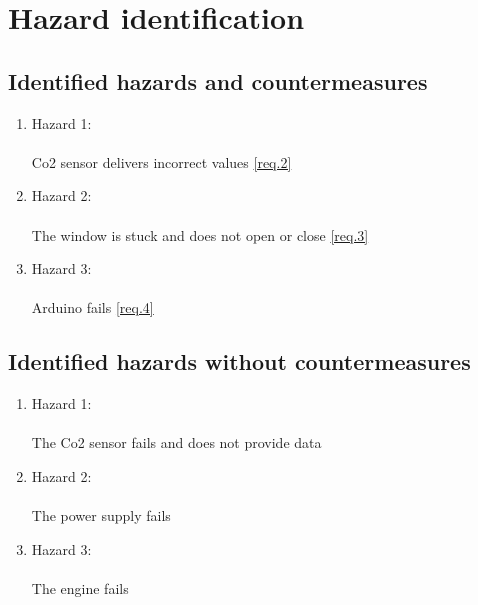 \section{Hazard identification}
\label{chapter4}

\subsection{Identified hazards and countermeasures}


	\begin{enumerate}
		\item \label{hazc.1} Hazard 1: \\
            \\	Co2 sensor delivers incorrect values \ref{req.2} \\
		\item \label{hazc.2} Hazard 2: \\
            \\	The window is stuck and does not open or close \ref{req.3} \\
		\item \label{hazc.3} Hazard 3: \\
            \\	Arduino fails \ref{req.4} \\
	\end{enumerate}
	
\subsection{Identified hazards without countermeasures }

	\begin{enumerate}
		\item \label{haz.1} Hazard 1: \\
            \\	The Co2 sensor fails and does not provide data \\
		\item \label{haz.2} Hazard 2: \\
            \\	The power supply fails \\
		\item \label{haz.3} Hazard 3: \\
            \\	The engine fails \\
	\end{enumerate}